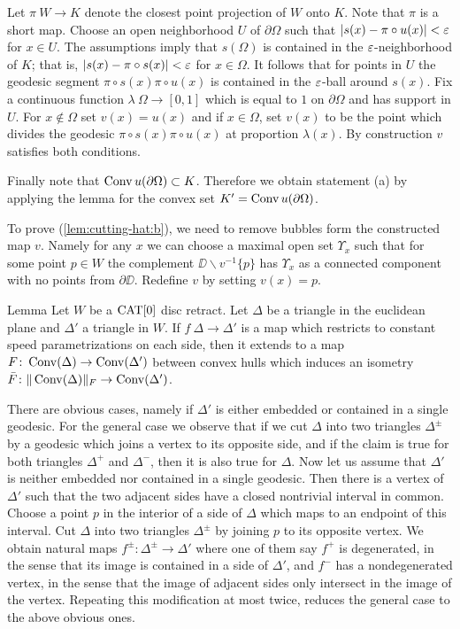 \documentclass[a4paper,10pt]{amsart}
\begin{document}
Let $\pi\:W\to K$ denote the closest point projection of $W$ onto $K$. Note that $\pi$
is a short map. Choose an open neighborhood $U$ of $\partial \Omega$ such that 
$|s(x)-\pi\circ u(x)|<\varepsilon$ for $x\in U$. The assumptions imply that $s(\Omega)$ is 
contained in the $\varepsilon$-neighborhood of $K$;
that is, $|s(x)-\pi\circ s(x)|<\varepsilon$ for $x\in\Omega$.
It follows that for points in $U$ the geodesic segment $\pi\circ s(x)\pi\circ u(x)$ is contained in the $\varepsilon$-ball
around $s(x)$. Fix a continuous function $\lambda\:\Omega\to [0,1]$
which is equal to $1$ on $\partial \Omega$ and has support in $U$.
For $x\notin \Omega$ set $v(x)=u(x)$ and if 
$x\in \Omega$, set $v(x)$ to be the point which divides the geodesic $\pi\circ s(x)\pi\circ u(x)$
at proportion $\lambda(x)$. By construction $v$ satisfies both conditions.

Finally note that $\mathop{\rm Conv}\nolimits u(\partial\Omega)\subset K$. 
Therefore we obtain statement (a) 
by applying the lemma for the convex set $K'=\mathop{\rm Conv}\nolimits u(\partial\Omega)$.

To prove (\ref{lem:cutting-hat:b}), we need to remove bubbles form the constructed map $v$.
Namely for any $x$ we can choose a maximal open set $\Upsilon_x$ such that for some point $p\in W$ the complement $\DD\backslash v^{-1}\{p\}$ has $\Upsilon_x$ as a
connected component with no points from $\partial \DD$.
Redefine $v$ by setting $v(x)=p$.
\qeds

\begin{thm}{Lemma}\label{lem:isomtri}
Let $W$ be a $\mathop{\rm CAT}\nolimits[0]$ disc retract. 
Let $\Delta$ be a triangle in the euclidean plane
and $\Delta'$ a triangle in $W$. 
If $f\:\Delta\to \Delta'$ is a map which restricts to constant speed
parametrizations on each side, then it extends to a map 
$F\colon\mathop{\rm Conv}\nolimits(\Delta)\to \mathop{\rm Conv}\nolimits(\Delta')$ between convex hulls which induces an isometry $\bar F\colon\|\mathop{\rm Conv}\nolimits(\Delta)\|_F\to \mathop{\rm Conv}\nolimits(\Delta')$. 
\end{thm}

There are obvious cases, namely if $\Delta'$ is either embedded or contained in a single geodesic. 
For the general case we observe that if we cut $\Delta$ into two triangles $\Delta^\pm$ by a geodesic which joins a vertex to its opposite side, and if 
the claim is true for both triangles $\Delta^+$ and $\Delta^-$, then it is also true for $\Delta$. Now let us assume that $\Delta'$ is neither embedded nor contained
in a single geodesic. Then there is a vertex of $\Delta'$ such that the two adjacent sides have a closed nontrivial interval in common. Choose a point $p$ in the interior
of a side of $\Delta$ which maps to an endpoint of this interval. Cut $\Delta$ into two triangles $\Delta^\pm$ by joining $p$ to its opposite vertex.
We obtain natural maps $f^\pm:\Delta^\pm\to\Delta'$ where one of them say $f^+$ is degenerated, in the sense that its image is contained in a side of $\Delta'$, and $f^-$ has 
a nondegenerated vertex, in the sense that the image of adjacent sides only intersect in the image of the vertex. Repeating this modification at most twice,
reduces the general case to the above obvious ones.
\qeds
\end{document}
